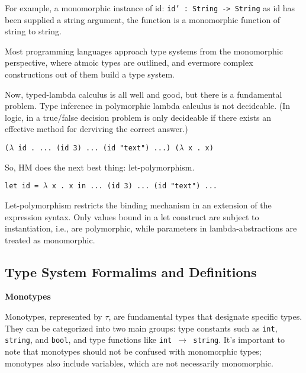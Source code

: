 \documentclass{l4proj}
\begin{document}
For example, a monomorphic instance of id: \texttt{id' : String -> String} as id has been supplied a string argument, the function is a monomorphic function of string to string.

Most programming languages approach type systems from the monomorphic perspective, where atmoic types are outlined, and evermore complex constructions out of them build a type system.


Now, typed-lambda calculus is all well and good, but there is a fundamental problem. Type inference in polymorphic lambda calculus is not decideable. (In logic, in a true/false decision problem is only decideable if there exists an effective method for derviving the correct answer.)

\texttt{($\lambda$ id . ... (id 3) ... (id "text") ...) ($\lambda$ x . x)}

So, HM does the next best thing: let-polymorphism.

\texttt{let id = $\lambda$ x . x in ... (id 3) ... (id "text") ...}

Let-polymorphism restricts the binding mechanism in an extension of the expression syntax. Only values bound in a let construct are subject to instantiation, i.e., are polymorphic, while parameters in lambda-abstractions are treated as monomorphic.

\subsection{Type System Formalims and Definitions}

\textbf{Monotypes}

Monotypes, represented by $\tau$, are fundamental types that designate specific types.
They can be categorized into two main groups: type constants such as \texttt{int}, \texttt{string}, and \texttt{bool}, and type functions like \texttt{int $\rightarrow$ string}.
It's important to note that monotypes should not be confused with monomorphic types; monotypes also include variables, which are not necessarily monomorphic.
\end{document}

